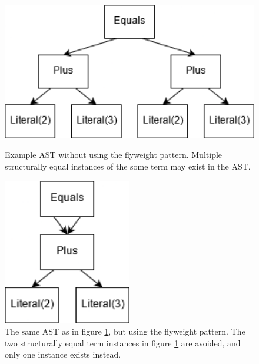 \documentclass[11pt]{article}
\begin{document}
    \begin{figure}[H]
        \begin{center}
            \begin{minipage}{.4\textwidth}
                \begin{center}
                    \includegraphics[width=1.0\textwidth]{no-flyweight.png}
                    \caption{Example AST without using the flyweight pattern. Multiple structurally equal instances of the some term may exist in the AST.}
                    \label{fig:no-flyweight-ast}
                \end{center}
            \end{minipage}
            \hspace{.1\textwidth}
            \begin{minipage}{.35\textwidth}
                \begin{center}
                    \includegraphics[width=0.5\textwidth]{with-flyweight.png}
                    \caption{The same AST as in figure \ref{fig:no-flyweight-ast}, but using the flyweight pattern. The two structurally equal term instances in figure \ref{fig:no-flyweight-ast} are avoided, and only one instance exists instead.}
                \end{center}
            \end{minipage}
        \end{center}
    \end{figure}
\end{document}
